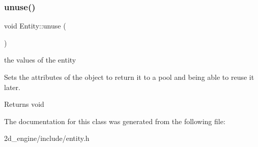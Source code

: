 \subsubsection{\texorpdfstring{unuse()}{unuse()}}
{\footnotesize\ttfamily void Entity\+::unuse (\begin{DoxyParamCaption}{ }\end{DoxyParamCaption})}

the values of the entity

Sets the attributes of the object to return it to a pool and being able to reuse it later.

\begin{DoxyReturn}{Returns}
void 
\end{DoxyReturn}


The documentation for this class was generated from the following file\+:\begin{DoxyCompactItemize}
\item 
2d\+\_\+engine/include/entity.\+h\end{DoxyCompactItemize}
